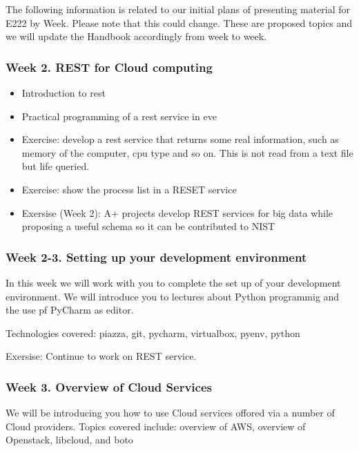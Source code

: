 \begin{WARNING}

The following information is related to our initial plans of
presenting material for E222 by Week. Please note that this could
change. These are proposed topics and we will update the Handbook
accordingly from week to week.

\end{WARNING}


\subsubsection{Week 2. REST for Cloud computing}

\begin{itemize}
\item Introduction to rest
\item Practical programming of a rest service in eve
\item Exercise: develop a rest service that returns some real
  information, such as memory of the computer, cpu type and so
  on. This is not read from a text file but life queried.
\item Exercise: show the process list in a RESET service
\item Exersise (Week 2): A+ projects develop REST services for big
  data while proposing a useful schema so it can be contributed to
  NIST
\end{itemize}

\subsubsection{Week 2-3. Setting up your development environment}

In this week we will work with you to complete the set up of your
development environment. We will introduce you to lectures about
Python programmig and the use pf PyCharm as editor.

Technologies covered:	piazza,	git,	pycharm,	virtualbox,	pyenv,	python

Exersise: Continue to work on REST service.

\subsubsection{Week 3. Overview of Cloud Services}

We will be introducing you how to use Cloud services offored via a
number of Cloud providers. Topics covered include: overview of AWS,
overview of Openstack, libcloud, and boto

